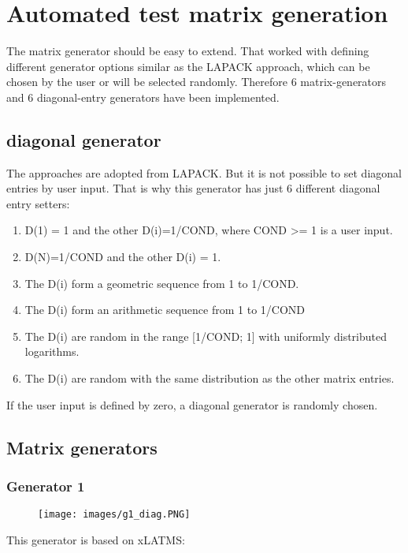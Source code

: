\documentclass[parskip=full]{scrartcl}
\begin{document}
\newpage
\section{Automated test matrix generation}

The matrix generator should be easy to extend.  
That worked with defining different generator options similar as the LAPACK approach, which can be chosen by the user or will be selected randomly.
Therefore 6 matrix-generators and 6 diagonal-entry generators have been implemented.

\subsection{diagonal generator}
The approaches are adopted from LAPACK. But it is not possible to set diagonal entries by user input. That is why this generator has just 6 different diagonal entry setters:
\begin{enumerate}
	\item D(1) = 1 and the other D(i)=1/COND, where COND >= 1 is a user input.
	\item D(N)=1/COND and the other D(i) = 1. 
	\item The D(i) form a geometric sequence from 1 to 1/COND. 
	\item The D(i) form an arithmetic sequence from 1 to 1/COND
	\item The D(i) are random in the range [1/COND; 1] with uniformly distributed logarithms. 
	\item The D(i) are random with the same distribution as the other matrix entries.
\end{enumerate}
If the user input is defined by zero, a diagonal generator is randomly chosen.

\newpage
\subsection{Matrix generators}

\subsubsection{Generator 1}
\begin{figure}[h!]
	\texttt{[image: images/g1\_diag.PNG]}
\end{figure}

This generator is based on xLATMS: 
\end{document}
